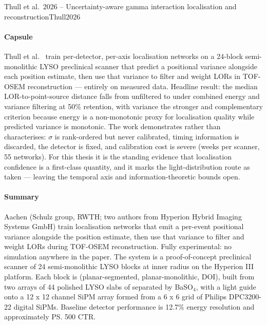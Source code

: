 \begin{papernote}{Thull et al.\ 2026 -- Uncertainty-aware gamma interaction localisation and reconstruction}{Thull2026}

\paragraph{Capsule}
Thull et al.\ \cite{Thull2026} train per-detector, per-axis localisation networks on a
24-block semi-monolithic LYSO preclinical scanner that predict a positional variance
alongside each position estimate, then use that variance to filter and weight LORs in
TOF-OSEM reconstruction --- entirely on measured data. Headline result: the median
LOR-to-point-source distance falls from  unfiltered to  under combined
energy and variance filtering at 50\% retention, with variance the stronger and
complementary criterion because energy is a non-monotonic proxy for localisation quality
while predicted variance is monotonic. The work demonstrates rather than characterises:
$\sigma$ is rank-ordered but never calibrated, timing information is discarded, the
detector is fixed, and calibration cost is severe (weeks per scanner, 55 networks).
For this thesis it is the standing evidence that localisation confidence is a
first-class quantity, and it marks the light-distribution route as taken --- leaving the
temporal axis and information-theoretic bounds open.

\paragraph{Summary}
Aachen (Schulz group, RWTH; two authors from Hyperion Hybrid Imaging Systems GmbH)
train localisation networks that emit a per-event positional variance alongside the
position estimate, then use that variance to filter and weight LORs during TOF-OSEM
reconstruction. Fully experimental: no simulation anywhere in the paper. The system is a
proof-of-concept preclinical scanner of 24 semi-monolithic LYSO blocks at  inner
radius on the Hyperion III platform. Each block is
 (planar-segmented,
planar-monolithic, DOI), built from two arrays of 44 polished LYSO slabs of
 separated by  BaSO$_4$, with a 
light guide onto a 12 x 12
channel SiPM array formed from a 6 x 6 grid of Philips DPC3200-22 digital SiPMs.
Baseline detector performance is 12.7\% energy resolution and approximately \ps{500} CTR.


\end{papernote}

